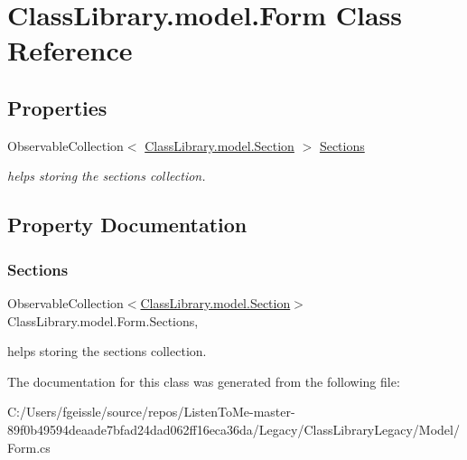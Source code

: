 \hypertarget{class_class_library_1_1model_1_1_form}{}\section{Class\+Library.\+model.\+Form Class Reference}
\label{class_class_library_1_1model_1_1_form}
\subsection*{Properties}
\begin{DoxyCompactItemize}
\item 
Observable\+Collection$<$ \mbox{\hyperlink{class_class_library_1_1model_1_1_section}{Class\+Library.\+model.\+Section}} $>$ \mbox{\hyperlink{class_class_library_1_1model_1_1_form_a2f9e51d0fa3181ffc1c783cd1ede207c}{Sections}}
\begin{DoxyCompactList}\small\item\em helps storing the sections collection. \end{DoxyCompactList}\end{DoxyCompactItemize}


\subsection{Property Documentation}
\mbox{\label{class_class_library_1_1model_1_1_form_a2f9e51d0fa3181ffc1c783cd1ede207c}} 
\subsubsection{\texorpdfstring{Sections}{Sections}}
{\footnotesize\ttfamily Observable\+Collection$<$\mbox{\hyperlink{class_class_library_1_1model_1_1_section}{Class\+Library.\+model.\+Section}}$>$ Class\+Library.\+model.\+Form.\+Sections\hspace{0.3cm}{\ttfamily [get]}, {\ttfamily [set]}}



helps storing the sections collection. 



The documentation for this class was generated from the following file\+:\begin{DoxyCompactItemize}
\item 
C\+:/\+Users/fgeissle/source/repos/\+Listen\+To\+Me-\/master-\/89f0b49594deaade7bfad24dad062ff16eca36da/\+Legacy/\+Class\+Library\+Legacy/\+Model/Form.\+cs\end{DoxyCompactItemize}
